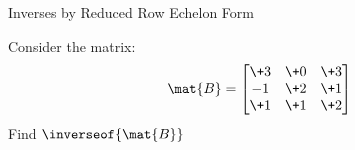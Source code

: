 \documentclass{beamer}
\begin{document}
\begin{frame}{Inverses by Reduced Row Echelon Form}
\begin{example}
\begin{overprint}
%
Consider the matrix:
\begin{equation*}
\mat{B}=
\begin{bmatrix}
\+3 & \+0 & \+3 \\
 -1 & \+2 & \+1 \\
\+1 & \+1 & \+2 \\
\end{bmatrix}
\end{equation*}
Find $\inverseof{\mat{B}}$

\end{overprint}
\end{example}
\end{frame}
\end{document}
